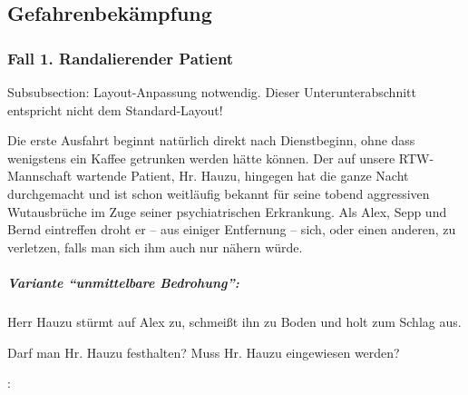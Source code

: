 \subsection{Gefahrenbekämpfung}

\subsubsection{Fall 1. Randalierender Patient}
\begin{anfxwarning}[author=GABS]{Subsubsection: Layout-Anpassung notwendig.}
Dieser Unterunterabschnitt entspricht nicht dem Standard-Layout!
\end{anfxwarning}

Die erste Ausfahrt beginnt nat\"urlich direkt nach Dienstbeginn, ohne
dass wenigstens ein Kaffee getrunken werden hätte k\"onnen. Der auf
unsere RTW-Mann\-schaft wartende Patient, Hr. Hauzu, hingegen hat die
ganze Nacht durchgemacht und ist schon weit\-läufig bekannt f\"ur seine
tobend aggressiven Wut\-aus\-br\"uche im Zuge seiner psychiatrischen
Erkrankung. Als Alex, Sepp und Bernd eintreffen droht er --
aus einiger Entfernung -- sich, oder einen anderen, zu
verletzen, falls man sich ihm auch nur nähern w\"urde.

\subparagraph{Variante "`unmittelbare Bedrohung"':} Herr Hauzu
stürmt auf Alex zu, schmeißt ihn zu Boden und holt zum
Schlag aus.

Darf man Hr. Hauzu festhalten? Muss Hr. Hauzu eingewiesen werden?


:

